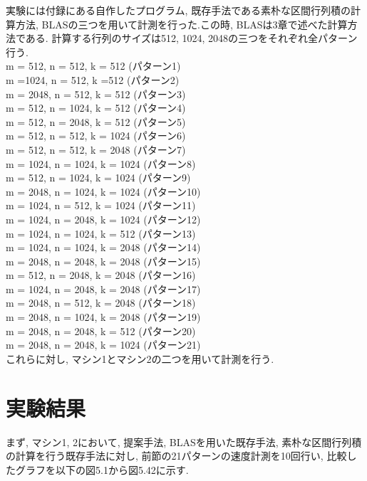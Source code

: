 \documentclass[11pt,a4paper]{jsreport}
\theoremstyle{definition}
\begin{document}
\indent 実験には付録にある自作したプログラム, 既存手法である素朴な区間行列積の計算方法, BLASの三つを用いて計測を行った.この時, BLASは3章で述べた計算方法である. 計算する行列のサイズは512, 1024, 2048の三つをそれぞれ全パターン行う. \\
\indent m = 512, n = 512, k = 512 (パターン1) \\
\indent m =1024, n = 512, k =512 (パターン2) \\
\indent m = 2048, n = 512, k = 512 (パターン3) \\
\indent m = 512, n = 1024, k  = 512 (パターン4) \\
\indent m = 512, n = 2048, k = 512 (パターン5) \\
\indent m = 512, n = 512, k = 1024 (パターン6) \\
\indent m = 512, n = 512, k = 2048 (パターン7) \\
\indent m = 1024, n = 1024, k = 1024 (パターン8) \\
\indent m = 512, n = 1024, k = 1024 (パターン9) \\
\indent m = 2048, n = 1024, k = 1024 (パターン10) \\
\indent m = 1024, n = 512, k = 1024 (パターン11) \\
\indent m = 1024, n = 2048, k = 1024 (パターン12) \\
\indent m = 1024, n = 1024, k = 512 (パターン13) \\
\indent m = 1024, n = 1024, k = 2048 (パターン14) \\
\indent m = 2048, n = 2048, k = 2048 (パターン15) \\
\indent m = 512, n = 2048, k = 2048 (パターン16) \\
\indent m = 1024, n = 2048, k = 2048 (パターン17) \\
\indent m = 2048, n = 512, k = 2048 (パターン18) \\
\indent m = 2048, n = 1024, k = 2048 (パターン19) \\
\indent m = 2048, n = 2048, k = 512 (パターン20) \\
\indent m = 2048, n = 2048, k = 1024 (パターン21) \\
これらに対し, マシン1とマシン2の二つを用いて計測を行う.
\newpage
\section{実験結果}
	まず, マシン1, 2において, 提案手法, BLASを用いた既存手法, 素朴な区間行列積の計算を行う既存手法に対し, 前節の21パターンの速度計測を10回行い, 比較したグラフを以下の図5.1から図5.42に示す.
\end{document}
